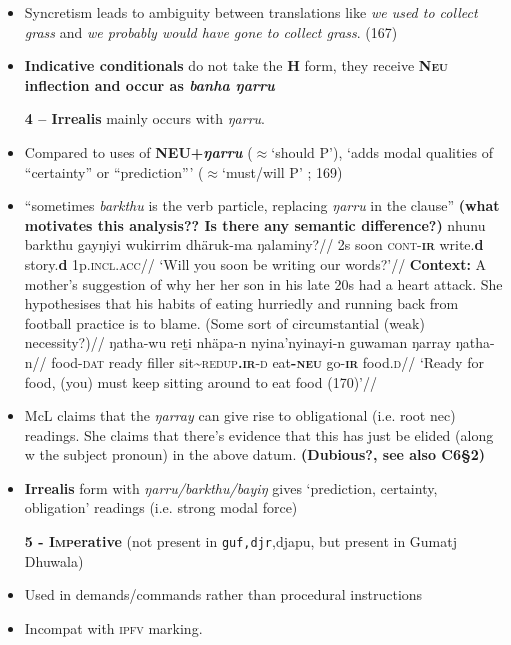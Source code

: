 \documentclass[10pt]{article}
\begin{document}
\begin{itemize}
		\item Syncretism leads to ambiguity between translations like \textit{we used to collect grass} and \textit{we probably would have gone to collect grass}. (167)
		\item \textbf{Indicative conditionals} do not take the \textbf{H} form, they receive \textbf{N\textsc{eu} inflection and occur as \textit{banha ŋarru} } 
	\item[\textbf{4 -- Irrealis}] mainly occurs with \textit{ŋarru}.
	\item Compared to uses of \textbf{NEU+\textit{ŋarru}} ($\approx$`should P'), `adds modal qualities of ``certainty'' or ``prediction''' ($\approx$`must/will P' ; 169)
	\item ``sometimes \textit{barkthu} is the verb particle, replacing \textit{ŋarru} in the clause'' \textbf{(what motivates this analysis?? Is there any semantic difference?)}
		\pex\a\begingl\gla nhunu barkthu gayŋiyi wukirrim dhäruk-ma ŋalaminy?//
		\glb 2s soon \textsc{cont-\textbf{ir}} write.\textbf{d} story.\textbf{d} 1p\textsc{.incl.acc}//
		\glft`Will you soon be writing our words?'//\endgl
		\a\begingl\glpreamble\textbf{Context:} A mother's suggestion of why her her son in his late 20s had a heart attack. She hypothesises that his habits of eating hurriedly and running back from football practice is to blame. (Some sort of circumstantial (weak) necessity?)//
		\gla ŋatha-wu reṯi nhäpa-n nyina'nyinayi-n guwaman ŋarray ŋatha-n//
		\glb food\textsc{-dat} ready filler sit\textasciitilde\textsc{redup\textbf{.ir}-d} eat\textsc{\textbf{-neu}} go\textsc{-\textbf{ir}} food.\textsc{d}//
		\glft`Ready for food, (you) must keep sitting around to eat food (170)'//\endgl\xe
		\item  McL claims that the \textit{ŋarray} can give rise to obligational (i.e. root nec) readings. She claims that there's evidence that this has just be elided (along w the subject pronoun) in the above datum. \textbf{(Dubious?, see also \textbf{C}6§2)}
		\item \textbf{Irrealis} form with \textit{ŋarru/barkthu/bayiŋ} gives `prediction, certainty, obligation' readings (i.e. strong modal force)
		\item[\textbf{5 - I\textsc{mp}erative}] (not present in \texttt{guf,djr},djapu, but present in Gumatj Dhuwala)
			\item Used in demands/commands rather than procedural instructions
			\item Incompat with \textsc{ipfv} marking.

\end{itemize}
\end{document}
